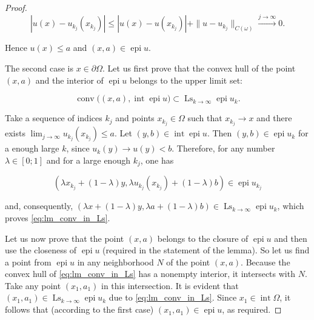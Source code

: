 \documentclass[14pt]{extarticle}
\renewcommand{\le}{\leqslant}
\DeclareMathOperator{\epi}{\mathrm{epi}}
\DeclareMathOperator{\conv}{\mathrm{conv}}
\DeclareMathOperator{\Int}{\mathrm{int}}
\DeclareMathOperator*{\Ls}{\mathrm{Ls}}
\theoremstyle{remark}
\theoremstyle{definition}
\begin{document}
\begin{proof}
	\[
		|u(x)-u_{k_j}(x_{k_j})| \le |u(x)-u(x_{k_j})| + \|u-u_{k_j}\|_{C(\omega)} 
		\stackrel{j\to\infty}{\longrightarrow} 0.
	\]

	\noindent Hence $u(x)\le a$ and $(x,a)\in\epi u$.
	
The second case is $x\in\partial\Omega$. Let us first prove that the convex hull of the point $(x,a)$ and the interior of $\epi u$ belongs to the upper limit set:  
   
	\begin{equation}
	\label{eq:lm_conv_in_Ls}
		\conv \big((x,a),\Int\epi u\big) \subset \Ls_{k\to\infty}\epi u_k.
	\end{equation}

	\noindent Take a sequence of indices $k_j$ and points $x_{k_j}\in\Omega$ such that $x_{k_j}\to x$ and there exists $\lim_{j\to\infty}u_{k_j}(x_{k_j})\le a$. Let $(y,b)\in\Int\epi u$. Then $(y,b)\in\epi u_{k}$ for a enough large $k$, since $u_k(y)\to u(y)<b$. Therefore, for any number $\lambda\in[0;1]$ and for a large enough $k_j$, one has 

	\[
		(\lambda x_{k_j}+(1-\lambda)y,\lambda u_{k_j}(x_{k_j}) + (1-\lambda)b)\in\epi u_{k_j}
	\]

	\noindent and, consequently, $(\lambda x+(1-\lambda)y,\lambda a+(1-\lambda)b)\in\Ls_{k\to\infty}\epi u_k$, which proves \eqref{eq:lm_conv_in_Ls}.

	Let us now prove that the point $(x,a)$ belongs to the closure of $\epi u$ and then use the closeness of $\epi u$ (required in the statement of the lemma). So let us find a point from $\epi u$ in any neighborhood $N$ of the point $(x,a)$. Because the convex hull of \eqref{eq:lm_conv_in_Ls} has a nonempty interior, it intersects with $N$. Take any point $(x_1,a_1)$ in this intersection. It is evident that $(x_1,a_1)\in\Ls_{k\to\infty} \epi u_k$ due to \eqref{eq:lm_conv_in_Ls}. Since $x_1\in\Int\Omega$, it follows that (according to the first case) $(x_1,a_1)\in\epi u$, as required.
\end{proof}
\end{document}
